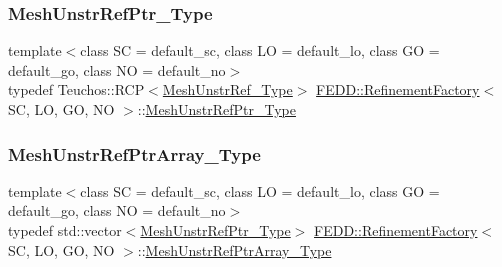 \mbox{\label{classFEDD_1_1RefinementFactory_aea0fab96821387bc772333299102b2c9}} 
\subsubsection{\texorpdfstring{Mesh\+Unstr\+Ref\+Ptr\+\_\+\+Type}{MeshUnstrRefPtr\_Type}}
{\footnotesize\ttfamily template$<$class SC  = default\+\_\+sc, class LO  = default\+\_\+lo, class GO  = default\+\_\+go, class NO  = default\+\_\+no$>$ \\
typedef Teuchos\+::\+R\+CP$<$\hyperlink{classFEDD_1_1RefinementFactory_a22aea92d236fb822fef9557c22834062}{Mesh\+Unstr\+Ref\+\_\+\+Type}$>$ \hyperlink{classFEDD_1_1RefinementFactory}{F\+E\+D\+D\+::\+Refinement\+Factory}$<$ SC, LO, GO, NO $>$\+::\hyperlink{classFEDD_1_1RefinementFactory_aea0fab96821387bc772333299102b2c9}{Mesh\+Unstr\+Ref\+Ptr\+\_\+\+Type}}

\mbox{\label{classFEDD_1_1RefinementFactory_af6e25bbcc6f5e8d6ee70a1c5aab1e3eb}} 
\subsubsection{\texorpdfstring{Mesh\+Unstr\+Ref\+Ptr\+Array\+\_\+\+Type}{MeshUnstrRefPtrArray\_Type}}
{\footnotesize\ttfamily template$<$class SC  = default\+\_\+sc, class LO  = default\+\_\+lo, class GO  = default\+\_\+go, class NO  = default\+\_\+no$>$ \\
typedef std\+::vector$<$\hyperlink{classFEDD_1_1RefinementFactory_aea0fab96821387bc772333299102b2c9}{Mesh\+Unstr\+Ref\+Ptr\+\_\+\+Type}$>$ \hyperlink{classFEDD_1_1RefinementFactory}{F\+E\+D\+D\+::\+Refinement\+Factory}$<$ SC, LO, GO, NO $>$\+::\hyperlink{classFEDD_1_1RefinementFactory_af6e25bbcc6f5e8d6ee70a1c5aab1e3eb}{Mesh\+Unstr\+Ref\+Ptr\+Array\+\_\+\+Type}}

